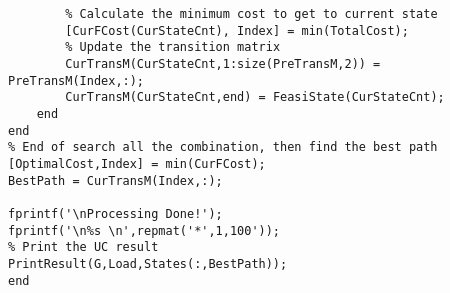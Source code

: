 \begin{verbatim}
        % Calculate the minimum cost to get to current state
        [CurFCost(CurStateCnt), Index] = min(TotalCost);
        % Update the transition matrix
        CurTransM(CurStateCnt,1:size(PreTransM,2)) = PreTransM(Index,:);
        CurTransM(CurStateCnt,end) = FeasiState(CurStateCnt);
    end
end
% End of search all the combination, then find the best path
[OptimalCost,Index] = min(CurFCost);
BestPath = CurTransM(Index,:);

fprintf('\nProcessing Done!');
fprintf('\n%s \n',repmat('*',1,100'));
% Print the UC result
PrintResult(G,Load,States(:,BestPath));
end
\end{verbatim}

